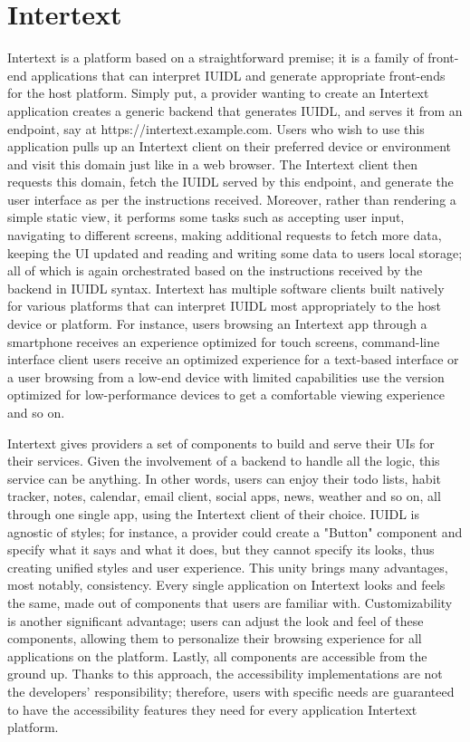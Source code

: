 
\chapter{Intertext}

Intertext is a platform based on a straightforward premise; it is a family of front-end applications that can interpret IUIDL and generate appropriate front-ends for the host platform. Simply put, a provider wanting to create an Intertext application creates a generic backend that generates IUIDL, and serves it from an endpoint, say at https://intertext.example.com. Users who wish to use this application pulls up an Intertext client on their preferred device or environment and visit this domain just like in a web browser. The Intertext client then requests this domain, fetch the IUIDL served by this endpoint, and generate the user interface as per the instructions received. Moreover, rather than rendering a simple static view, it performs some tasks such as accepting user input, navigating to different screens, making additional requests to fetch more data, keeping the UI updated and reading and writing some data to users local storage; all of which is again orchestrated based on the instructions received by the backend in IUIDL syntax. Intertext has multiple software clients built natively for various platforms that can interpret IUIDL most appropriately to the host device or platform. For instance, users browsing an Intertext app through a smartphone receives an experience optimized for touch screens, command-line interface client users receive an optimized experience for a text-based interface or a user browsing from a low-end device with limited capabilities use the version optimized for low-performance devices to get a comfortable viewing experience and so on. 

Intertext gives providers a set of components to build and serve their UIs for their services.  Given the involvement of a backend to handle all the logic, this service can be anything. In other words, users can enjoy their todo lists, habit tracker, notes, calendar, email client, social apps, news, weather and so on, all through one single app, using the Intertext client of their choice. IUIDL is agnostic of styles; for instance, a provider could create a "Button" component and specify what it says and what it does, but they cannot specify its looks, thus creating unified styles and user experience. This unity brings many advantages, most notably, consistency. Every single application on Intertext looks and feels the same, made out of components that users are familiar with. Customizability is another significant advantage; users can adjust the look and feel of these components, allowing them to personalize their browsing experience for all applications on the platform. Lastly, all components are accessible from the ground up. Thanks to this approach, the accessibility implementations are not the developers' responsibility; therefore, users with specific needs are guaranteed to have the accessibility features they need for every application Intertext platform. 


